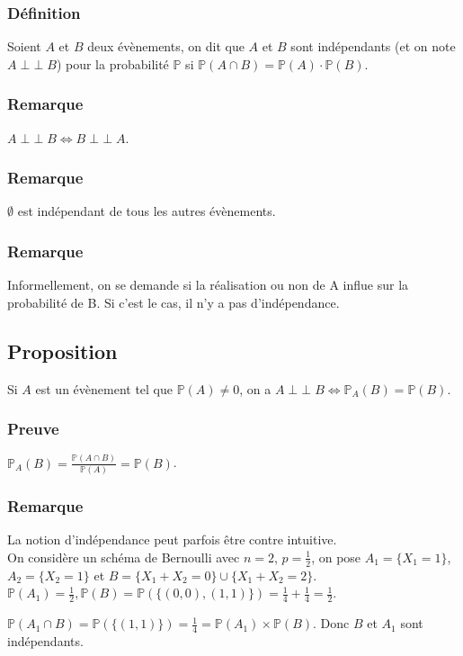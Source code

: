 \documentclass[a4paper,10pt]{book} %
\renewcommand{\P}{\mathbb{P}} %
\DeclareMathOperator{\ind}{\perp \!\!\! \perp}
\begin{document}
\subsubsection{Définition}
Soient $A$ et $B$ deux évènements, on dit que $A$ et $B$ sont indépendants (et on note $A\ind B$) pour la probabilité $\P$ si $\P(A\cap B)=\P(A)\cdot \P(B)$.

\subsubsection{Remarque}
$A \ind B \Leftrightarrow B\ind A$.

\subsubsection{Remarque}
$\emptyset$ est indépendant de tous les autres évènements.

\subsubsection{Remarque}
Informellement, on se demande si la réalisation ou non de A influe sur la probabilité de B. Si c'est le cas, il n'y a pas d'indépendance.

\subsection{Proposition}\label{proposition2.1.1}
Si $A$ est un évènement tel que $\P(A)\neq 0$, on a $A\ind B \Leftrightarrow \P_A(B)=\P(B)$.

\subsubsection{Preuve}
$\P_A(B)=\frac{\P(A\cap B)}{\P(A)}=\P(B)$.

\subsubsection{Remarque}
La notion d'indépendance peut parfois être contre intuitive.\\

On considère un schéma de Bernoulli avec $n=2$, $p=\frac{1}{2}$, on pose $A_1=\{X_1=1\}$, $A_2=\{X_2=1\}$ et $B=\{X_1+X_2=0\}\cup \{X_1+X_2=2\}$.\\

$\P(A_1)=\frac{1}{2}, \P(B)=\P(\{(0,0),(1,1)\})=\frac{1}{4}+\frac{1}{4}=\frac{1}{2}$.

$\P(A_1\cap B)=\P(\{(1,1)\})=\frac{1}{4}=\P(A_1)\times \P(B)$. Donc $B$ et $A_1$ sont indépendants.
\end{document}
